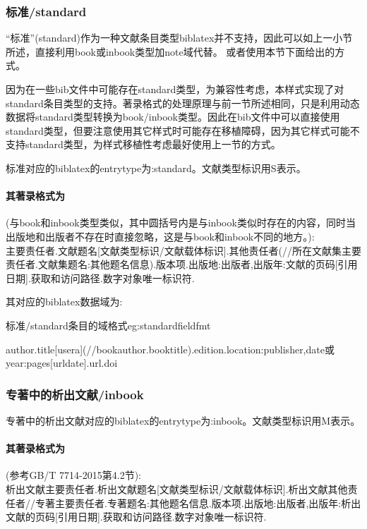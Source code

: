 \subsubsection{标准/standard}\label{sec:standard}
“标准”(standard)作为一种文献条目类型biblatex并不支持，因此可以如上一小节所述，直接利用book或inbook类型加note域代替。
或者使用本节下面给出的方式。

因为在一些bib文件中可能存在standard类型，为兼容性考虑，本样式实现了对standard条目类型的支持。著录格式的处理原理与前一节所述相同，只是利用动态数据将standard类型转换为book/inbook类型。因此在bib文件中可以直接使用standard类型，但要注意使用其它样式时可能存在移植障碍，因为其它样式可能不支持standard类型，为样式移植性考虑最好使用上一节的方式。

\begin{refentry}{}{}
标准对应的biblatex的entrytype为:standard。文献类型标识用S表示。

\paragraph{其著录格式为}(与book和inbook类型类似，其中圆括号内是与inbook类似时存在的内容，同时当出版地和出版者不存在时直接忽略，这是与book和inbook不同的地方。):\\
主要责任者.文献题名[文献类型标识/文献载体标识].其他责任者(//所在文献集主要责任者.文献集题名:其他题名信息).版本项.出版地:出版者,出版年:文献的页码[引用日期].获取和访问路径.数字对象唯一标识符.
\end{refentry}

其对应的biblatex数据域为:
\begin{example}{标准/standard条目的域格式}{eg:standardfieldfmt}
\begin{texlist}
author.title[usera](//bookauthor.booktitle).edition.location:publisher,date或year:pages[urldate].url.doi
\end{texlist}
\end{example}


\subsubsection{专著中的析出文献/inbook}
\begin{refentry}{}{}
专著中的析出文献对应的biblatex的entrytype为:inbook。文献类型标识用M表示。

\paragraph{其著录格式为}(参考GB/T 7714-2015第4.2节):\\
析出文献主要责任者.析出文献题名[文献类型标识/文献载体标识].析出文献其他责任者//专著主要责任者.专著题名:其他题名信息.版本项.出版地:出版者,出版年:析出文献的页码[引用日期].获取和访问路径.数字对象唯一标识符.
\end{refentry}

